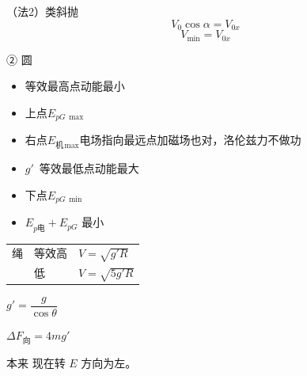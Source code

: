 \noindent （法2）类斜抛
\[ V_0\cos\alpha=V_{0x} \]
\[ V_{\min}=V_{0x} \]

\noindent ② 圆
\begin{itemize}
\item 等效最高点\quad 动能最小
\item 上点\quad $E_{pG\,\max}$
\item 右点\quad $E_{\text{机}\,\max}$\quad 电场指向最远点\qquad 加磁场也对，洛伦兹力不做功
\item $g'$\ 等效最低点\quad 动能最大
\item 下点\quad $E_{pG\,\min}$
\item $E_{p\text{电}}+E_{pG}$ 最小
\end{itemize}

\medskip
\noindent
\begin{tabular}{@{}lll@{}}
绳 & 等效高 & $V=\sqrt{g'R}$ \\
 & 低 & $V=\sqrt{5g'R}$
\end{tabular}
\qquad $g'=\dfrac{g}{\cos\theta}$

\noindent $\Delta F_{\text{向}}=4mg'$

\noindent 本来
\noindent 现在转 $E$ 方向为左。

